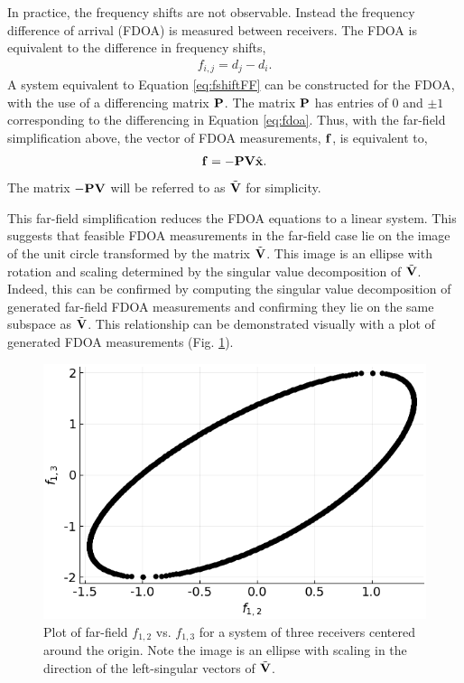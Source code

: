In practice, the frequency shifts are not observable. Instead the frequency difference of arrival (FDOA) is measured between receivers. The FDOA is equivalent to the difference in frequency shifts,
\begin{align}
  \label{eq:fdoa}
  f_{i,j} = d_j-d_i.
\end{align}
A system equivalent to Equation \eqref{eq:fshiftFF} can be constructed for the FDOA, with the use of a differencing matrix $\mathbf{P}$. The matrix $\mathbf{P}$ has entries of 0 and $\pm 1$ corresponding to the differencing in Equation \eqref{eq:fdoa}. Thus, with the far-field simplification above, the vector of FDOA measurements, $\mathbf{f}$, is equivalent to,
\begin{align}
  \label{eq:fdoaFF}
\mathbf{f} = -\mathbf{PV}\hat{\mathbf{x}}.
\end{align}
The matrix $\mathbf{-PV}$ will be referred to as $\tilde{\mathbf{V}}$ for simplicity.

This far-field simplification reduces the FDOA equations to a linear system. This suggests that feasible FDOA measurements in the far-field case lie on the image of the unit circle transformed by the matrix $\tilde{\mathbf{V}}$. This image is an ellipse with rotation and scaling determined by the singular value decomposition of $\tilde{\mathbf{V}}$. Indeed, this can be confirmed by computing the singular value decomposition of generated far-field FDOA measurements and confirming they lie on the same subspace as $\tilde{\mathbf{V}}$. This relationship can be demonstrated visually with a plot of generated FDOA measurements (Fig. \ref{f:ellipse}).

\begin{figure}[h!]
  \includegraphics[scale=0.7]{FDOAellipse.png}
  \caption{Plot of far-field $f_{1,2}$ vs. $f_{1,3}$ for a system of three receivers centered around the origin. Note the image is an ellipse with scaling in the direction of the left-singular vectors of $\tilde{\mathbf{V}}$.}
  \label{f:ellipse}
\end{figure}


